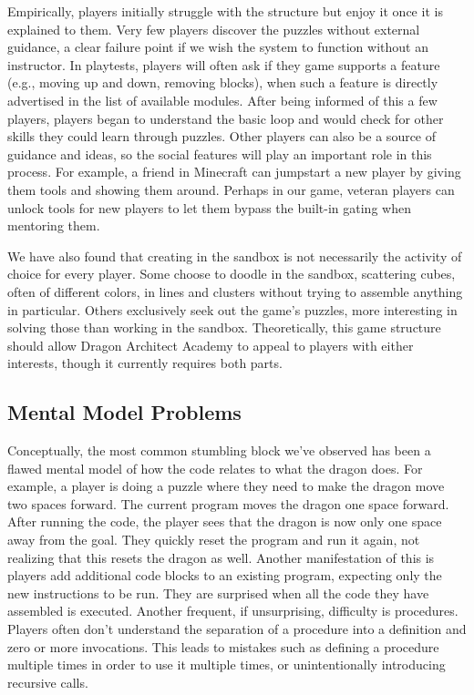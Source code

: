 \documentclass{sig-alternate}
\newcommand{\gametitle}{{\color{RoyalPurple} Dragon Architect Academy}}
\begin{document}
Empirically, players initially struggle with the structure but enjoy it once it is explained to them.
Very few players discover the puzzles without external guidance, a clear failure point if we wish the system to function without an instructor.
In playtests, players will often ask if they game supports a feature (e.g., moving up and down, removing blocks), when such a feature is directly advertised in the list of available modules.
After being informed of this a few players, players began to understand the basic loop and would check for other skills they could learn through puzzles.
Other players can also be a source of guidance and ideas, so the social features will play an important role in this process.
For example, a friend in Minecraft can jumpstart a new player by giving them tools and showing them around.
Perhaps in our game, veteran players can unlock tools for new players to let them bypass the built-in gating when mentoring them.

We have also found that creating in the sandbox is not necessarily the activity of choice for every player. 
Some choose to doodle in the sandbox, scattering cubes, often of different colors, in lines and clusters without trying to assemble anything in particular.
Others exclusively seek out the game's puzzles, more interesting in solving those than working in the sandbox.
Theoretically, this game structure should allow \gametitle{} to appeal to players with either interests, though it currently requires both parts.

\subsection{Mental Model Problems}

Conceptually, the most common stumbling block we've observed has been a flawed mental model of how the code relates to what the dragon does. 
For example, a player is doing a puzzle where they need to make the dragon move two spaces forward. 
The current program moves the dragon one space forward. 
After running the code, the player sees that the dragon is now only one space away from the goal. 
They quickly reset the program and run it again, not realizing that this resets the dragon as well. 
Another manifestation of this is players add additional code blocks to an existing program, expecting only the new instructions to be run. 
They are surprised when all the code they have assembled is executed. 
Another frequent, if unsurprising, difficulty is procedures. 
Players often don't understand the separation of a procedure into a definition and zero or more invocations. 
This leads to mistakes such as defining a procedure multiple times in order to use it multiple times, or unintentionally introducing recursive calls. 
\end{document}
